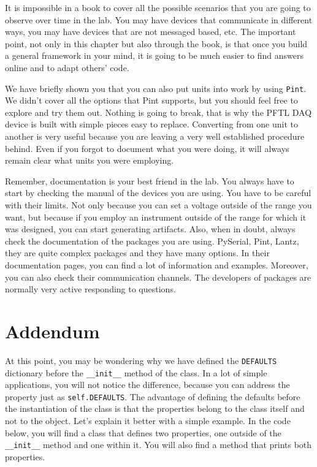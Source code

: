 It is impossible in a book to cover all the possible scenarios that you
are going to observe over time in the lab. You may have devices that
communicate in different ways, you may have devices that are not
messaged based, etc. The important point, not only in this chapter but
also through the book, is that once you build a general framework in
your mind, it is going to be much easier to find answers online and to
adapt others' code.

We have briefly shown you that you can also put units into work by using
\texttt{Pint}. We didn't cover all the options that Pint supports, but
you should feel free to explore and try them out. Nothing is going to
break, that is why the {PFTL} {DAQ} device is built with simple pieces
easy to replace. Converting from one unit to another is very useful
because you are leaving a very well established procedure behind. Even
if you forgot to document what you were doing, it will always remain
clear what units you were employing.

Remember, documentation is your best friend in the lab. You always have
to start by checking the manual of the devices you are using. You have
to be careful with their limits. Not only because you can set a voltage
outside of the range you want, but because if you employ an instrument
outside of the range for which it was designed, you can start generating
artifacts. Also, when in doubt, always check the documentation of the
packages you are using. PySerial, Pint, Lantz, they are quite complex
packages and they have many options. In their documentation pages, you
can find a lot of information and examples. Moreover, you can also check
their communication channels. The developers of packages are normally
very active responding to questions.

\hypertarget{addendum}{}
\section{Addendum}\label{addendum}

At this point, you may be wondering why we have defined the
\texttt{DEFAULTS} dictionary before the \texttt{\_\_init\_\_} method of
the class. In a lot of simple applications, you will not notice the
difference, because you can address the property just as
\texttt{self.DEFAULTS}. The advantage of defining the defaults before
the instantiation of the class is that the properties belong to the
class itself and not to the object. Let's explain it better with a
simple example. In the code below, you will find a class that defines
two properties, one outside of the \texttt{\_\_init\_\_} method and one
within it. You will also find a method that prints both properties.

